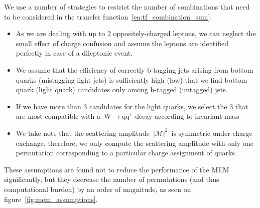 We use a number of strategies to restrict the number of combinations that need to be considered in the transfer function~\cref{eq:tf_combination_sum}. 

\begin{itemize}
\item As we are dealing with up to 2 oppositely-charged leptons, we can neglect the small effect of charge confusion and assume the leptons are identified perfectly in case of a dileptonic event.
\item We assume that the efficiency of correctly b-tagging jets arising from bottom quarks (mistagging light jets) is sufficiently high (low) that we find bottom quark (light quark) candidates only among b-tagged (untagged) jets.
\item If we have more than 3 candidates for the light quarks, we select the 3 that are most compatible with a~$\mathrm{W} \rightarrow \mathrm{q}\mathrm{q}'$~decay according to invariant mass
\item We take note that the scattering amplitude~$|\mathcal{M}|^2$~is symmetric under charge exchange, therefore, we only compute the scattering amplitude with only one permutation corresponding to a particular charge assignment of quarks.
\end{itemize}
These assumptions are found not to reduce the performance of the MEM significantly, but they decrease the number of permutations (and thus computational burden) by an order of magnitude, as seen on figure~\cref{fig:mem_assumptions}.

